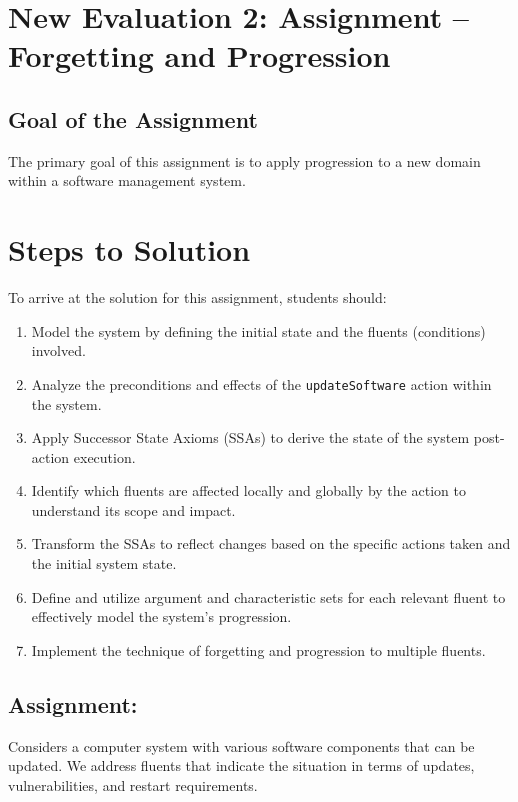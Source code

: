 \documentclass{assignment}
\begin{document}
\begin{problem}

\section*{New Evaluation 2: Assignment -- Forgetting and Progression}

\subsection*{Goal of the Assignment}
The primary goal of this assignment is to apply progression to a new domain within a software management system.

\section*{Steps to Solution}
To arrive at the solution for this assignment, students should:
\begin{enumerate}
    \item Model the system by defining the initial state and the fluents (conditions) involved.
    \item Analyze the preconditions and effects of the \texttt{updateSoftware} action within the system.
    \item Apply Successor State Axioms (SSAs) to derive the state of the system post-action execution.
    \item Identify which fluents are affected locally and globally by the action to understand its scope and impact.
    \item Transform the SSAs to reflect changes based on the specific actions taken and the initial system state.
    \item Define and utilize argument and characteristic sets for each relevant fluent to effectively model the system's progression.
    \item Implement the technique of forgetting and progression to multiple fluents.
\end{enumerate}

\subsection*{Assignment:}
Considers a computer system with various software components that can be updated. We address fluents that indicate the situation in terms of updates, vulnerabilities, and restart requirements.


\end{problem}
\end{document}
